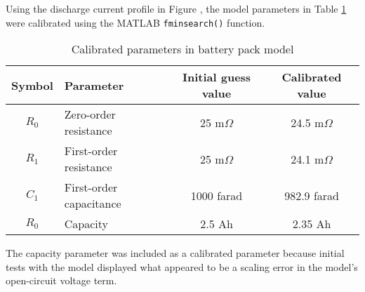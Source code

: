 \documentclass[../SimBALink.tex]{subfiles}
\begin{document}
			
			Using the discharge current profile in Figure , the model parameters in Table \ref{table:battery_calibrated_parameters} were calibrated using the MATLAB \texttt{fminsearch()} function.
			
			\begin{table}
				\centering
				\caption{Calibrated parameters in battery pack model}
				\label{table:battery_calibrated_parameters}
				\begin{tabular}{c | l | c | c}
					Symbol		&	Parameter			&	Initial guess value	&	Calibrated value	\\
					\hline
					$R_0$		&	Zero-order resistance	&	25 m$\Omega$	&	24.5 m$\Omega$	\\
					$R_1$		&	First-order resistance	&	25 m$\Omega$	&	24.1 m$\Omega$	\\
					$C_1$		&	First-order capacitance	&	1000 farad		&	982.9 farad		\\
					$R_0$		&	Capacity				&	2.5 Ah			&	2.35 Ah
				\end{tabular}
			\end{table}
			
			The capacity parameter was included as a calibrated parameter because initial tests with the model displayed what appeared to be a scaling error in the model's open-circuit voltage term.
		
		
\end{document}
